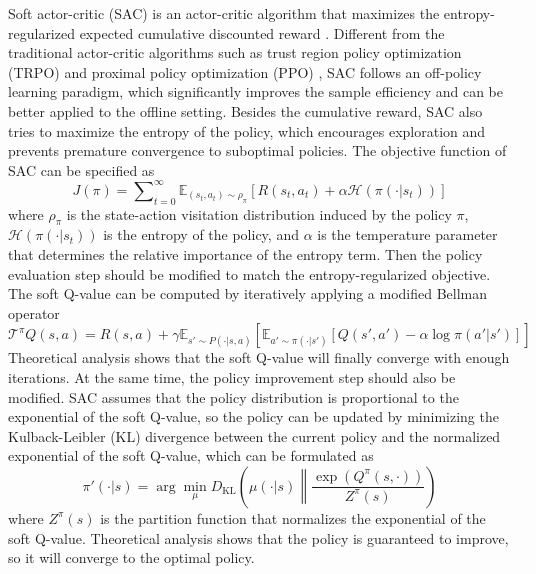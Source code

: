 Soft actor-critic (SAC) is an actor-critic algorithm that maximizes the entropy-regularized expected cumulative discounted reward \cite{haarnoja2018soft}. Different from the traditional actor-critic algorithms such as trust region policy optimization (TRPO) \cite{schulman2015trust} and proximal policy optimization (PPO) \cite{schulman2017proximal}, SAC follows an off-policy learning paradigm, which significantly improves the sample efficiency and can be better applied to the offline setting. Besides the cumulative reward, SAC also tries to maximize the entropy of the policy, which encourages exploration and prevents premature convergence to suboptimal policies. The objective function of SAC can be specified as
\begin{equation}
    J(\pi) = \sum \nolimits_{t=0}^{\infty} \mathbb{E}_{(s_t, a_t) \sim \rho_{\pi}} \left[ R(s_t, a_t) + \alpha \mathcal{H}(\pi(\cdot|s_t)) \right]
\end{equation}
where $\rho_{\pi}$ is the state-action visitation distribution induced by the policy $\pi$, $\mathcal{H}(\pi(\cdot|s_t))$ is the entropy of the policy, and $\alpha$ is the temperature parameter that determines the relative importance of the entropy term. Then the policy evaluation step should be modified to match the entropy-regularized objective. The soft Q-value can be computed by iteratively applying a modified Bellman operator
\begin{equation}
    \mathcal{T}^{\pi}Q(s, a) = R(s, a) + \gamma \mathbb{E}_{s' \sim P(\cdot|s, a)} \left[ \mathbb{E}_{a' \sim \pi(\cdot|s')} \left[ Q(s', a') - \alpha \log \pi(a'|s') \right] \right]
\end{equation}
Theoretical analysis shows that the soft Q-value will finally converge with enough iterations. At the same time, the policy improvement step should also be modified. SAC assumes that the policy distribution is proportional to the exponential of the soft Q-value, so the policy can be updated by minimizing the Kulback-Leibler (KL) divergence between the current policy and the normalized exponential of the soft Q-value, which can be formulated as
\begin{equation}
    \pi'(\cdot|s) = \arg \min_{\mu} D_{\text{KL}} \left( \mu(\cdot|s) \left\| \frac{\exp(Q^{\pi}(s, \cdot))}{Z^{\pi}(s)} \right. \right)
\end{equation}
where $Z^{\pi}(s)$ is the partition function that normalizes the exponential of the soft Q-value. Theoretical analysis shows that the policy is guaranteed to improve, so it will converge to the optimal policy.

